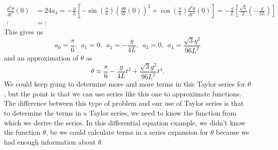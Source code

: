 \begin{exercises}
\begin{exerciseSolution}
\begin{align*}
\frac{d^4 \theta}{dt^4}(0) &= 24a_4 = -\frac{g}{L}\left[-\sin\left(\frac{\pi}{6}\right)\left(\frac{d \theta}{dt}(0)\right)^2 + \cos\left(\frac{\pi}{6}\right)\frac{d^2 \theta}{dt^2}(0) \right] = -\frac{g}{L}\left[\frac{\sqrt{3}}{2}\left(-\frac{g}{2L}\right)\right]  \\
\vdots &= \vdots
\end{align*}
This gives us
\[a_0 = \frac{\pi}{6}, \ \ a_1 = 0, \ \ a_2 = -\frac{g}{4L}, \ \ a_3 = 0, \ \ a_4 = \frac{\sqrt{3} g^2}{96L^2}\]
and an approximation of $\theta$ as
\[\theta \approx \frac{\pi}{6} - \frac{g}{4L}t^2 + \frac{\sqrt{3}g^2}{96L^2} t^4.\]
We could keep going to determine more and more terms in this Taylor series for $\theta$, but the point is that we can use series like this one to approximate functions. The difference between this type of problem and our use of Taylor series is that to determine the terms in a Taylor series, we need to know the function from which we derive the series. In this differential equation example, we didn't know the function $\theta$, be we could calculate terms in a series expansion for $\theta$ because we had enough information about $\theta$.

\end{exerciseSolution}

\end{exercises}

\afterexercises
